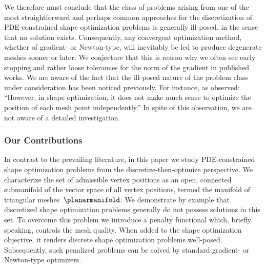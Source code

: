 We therefore must conclude that the class of problems arising from one of the most straightforward and perhaps common approaches for the discretization of PDE-constrained shape optimization problems is generally ill-posed, in the sense that no solution exists.
Consequently, any convergent optimization method, whether of gradient- or Newton-type, will inevitably be led to produce degenerate meshes sooner or later.
We conjecture that this is reason why we often see early stopping and rather loose tolerances for the norm of the gradient in published works.
We are aware of the fact that the ill-posed nature of the problem class under consideration has been noticed previously.
For instance, as \cite{Berggren:2010:1} observed: \enquote{However, in shape optimization, it does not make much sense to optimize the position of each mesh point independently.}
In spite of this observation, we are not aware of a detailed investigation.


\subsubsection*{Our Contributions}
In contrast to the prevailing literature, in this paper we study PDE-constrained shape optimization problems from the discretize-then-optimize perspective.
We characterize the set of admissible vertex positions as an open, connected submanifold of the vector space of all vertex positions, termed the manifold of triangular meshes~$\planarmanifold$.
We demonstrate by example that discretized shape optimization problems generally do not possess solutions in this set.
To overcome this problem we introduce a penalty functional which, briefly speaking, controls the mesh quality.
When added to the shape optimization objective, it renders discrete shape optimization problems well-posed.
Subsequently, such penalized problems can be solved by standard gradient- or Newton-type optimizers.

